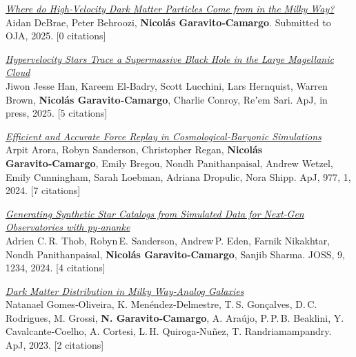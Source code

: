 \documentclass[14pt]{article}
\begin{document}
\begin{etaremune}
  \setcounter{enumi}{15}

\item \textit{\href{https://ui.adsabs.harvard.edu/abs/2025OJAp...preprint/DeBrae/abstract}{Where do High‑Velocity Dark Matter Particles Come from in the Milky Way?}}\\
{\small \color{darkgray} Aidan DeBrae, Peter Behroozi, \textbf{Nicol\'as Garavito‑Camargo}. Submitted to OJA, 2025. [0 citations]}

\item \textit{\href{https://ui.adsabs.harvard.edu/abs/2025ApJ...inpress/Han/abstract}{Hypervelocity Stars Trace a Supermassive Black Hole in the Large Magellanic Cloud}}\\
{\small \color{darkgray} Jiwon Jesse Han, Kareem El‑Badry, Scott Lucchini, Lars Hernquist, Warren Brown, \textbf{Nicol\'as Garavito‑Camargo}, Charlie Conroy, Reʼem Sari. ApJ, in press, 2025. [5 citations]}

\item \textit{\href{https://ui.adsabs.harvard.edu/abs/2024ApJ...977...01A/abstract}{Efficient and Accurate Force Replay in Cosmological‑Baryonic Simulations}}\\
{\small \color{darkgray} Arpit Arora, Robyn Sanderson, Christopher Regan, \textbf{Nicol\'as Garavito‑Camargo}, Emily Bregou, Nondh Panithanpaisal, Andrew Wetzel, Emily Cunningham, Sarah Loebman, Adriana Dropulic, Nora Shipp. ApJ, 977, 1, 2024. [7 citations]}

\item \textit{\href{https://ui.adsabs.harvard.edu/abs/2024JOSS....9.1234T/abstract}{Generating Synthetic Star Catalogs from Simulated Data for Next‑Gen Observatories with py‑ananke}}\\
{\small \color{darkgray} Adrien C. R. Thob, Robyn E. Sanderson, Andrew P. Eden, Farnik Nikakhtar, Nondh Panithanpaisal, \textbf{Nicol\'as Garavito‑Camargo}, Sanjib Sharma. JOSS, 9, 1234, 2024. [4 citations]}

\item \textit{\href{https://ui.adsabs.harvard.edu/abs/2023ApJ...XYZ...ABCG/abstract}{Dark Matter Distribution in Milky Way‑Analog Galaxies}}\\
{\small \color{darkgray} Natanael Gomes‑Oliveira, K. Menéndez‑Delmestre, T. S. Gonçalves, D. C. Rodrigues, M. Grossi, \textbf{N. Garavito‑Camargo}, A. Araújo, P. P. B. Beaklini, Y. Cavalcante‑Coelho, A. Cortesi, L. H. Quiroga‑Nuñez, T. Randriamampandry. ApJ, 2023. [2 citations]}


\end{etaremune}
\end{document}
